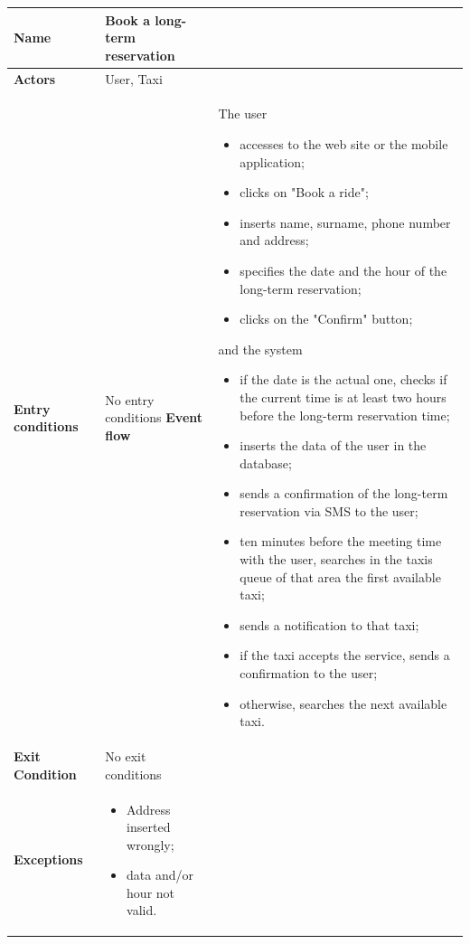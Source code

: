  \newpage
 \begin{tabular}{l l}
 \textbf{Name} & Book a long-term reservation \\ \hline
 \textbf{Actors} & User, Taxi \\ \hline
 \textbf{Entry conditions} & No entry conditions
 \textbf{Event flow}
 & \parbox{0.7\textwidth}{
 The user
 \begin{itemize}
 \item accesses to the web site or the mobile application;
 \item clicks on "Book a ride";
 \item inserts name, surname, phone number and address;
 \item specifies the date and the hour of the long-term reservation;
 \item clicks on the "Confirm" button;
 \end{itemize}
 and the system
 \begin{itemize}
 \item if the date is the actual one, checks if the current time is at least two hours before the long-term reservation time;
 \item inserts the data of the user in the database;
 \item sends a confirmation of the long-term reservation via SMS to the user;
 \item ten minutes before the meeting time with the user, searches in the taxis queue of that area the first available taxi;
 \item sends a notification to that taxi;
 \item if the taxi accepts the service, sends a confirmation to the user;
 \item otherwise, searches the next available taxi.
 \end{itemize}
 } \\ \hline
 \textbf{Exit Condition} & No exit conditions \\ \hline
 \textbf{Exceptions} &  \parbox{0.7\textwidth}{ 
 \begin{itemize}
 \item Address inserted wrongly;
 \item data and/or hour not valid.
 \end{itemize}
 }
\end{tabular}

